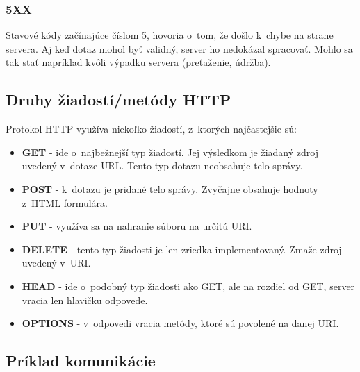 \documentclass[slovak]{fitthesis}
\begin{document}
\label{5XX}
\subsubsection{5XX}
Stavové kódy začínajúce číslom 5, hovoria o~tom, že došlo k~chybe na strane servera. Aj keď dotaz mohol byť validný, server ho nedokázal spracovať. Mohlo sa tak stať napríklad kvôli výpadku servera (preťaženie, údržba).

\subsection{Druhy žiadostí/metódy HTTP}
Protokol HTTP využíva niekoľko žiadostí, z~ktorých najčastejšie sú:
\begin{itemize}
    \item \textbf{GET} - ide o~najbežnejší typ žiadostí. Jej výsledkom je žiadaný zdroj uvedený v~dotaze URL. Tento typ dotazu neobsahuje telo správy.
    \item \textbf{POST} - k~dotazu je pridané telo správy. Zvyčajne obsahuje hodnoty z~HTML formulára.
    \item \textbf{PUT} - využíva sa na nahranie súboru na určitú URI.
    \item \textbf{DELETE} - tento typ žiadosti je len zriedka implementovaný. Zmaže zdroj uvedený v~URI.
    \item \textbf{HEAD} - ide o~podobný typ žiadosti ako GET, ale na rozdiel od GET, server vracia len hlavičku odpovede.
    \item \textbf{OPTIONS} - v~odpovedi vracia metódy, ktoré sú povolené na danej URI.
\end{itemize}




\newpage

\subsection{Príklad komunikácie}
\end{document}

